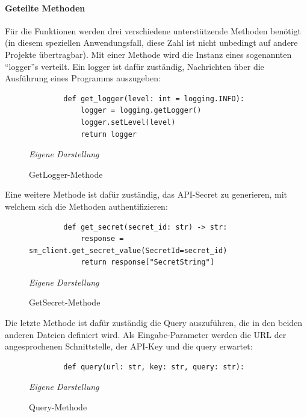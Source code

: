 	\paragraph{Geteilte Methoden}
		Für die Funktionen werden drei verschiedene unterstützende Methoden benötigt (in diesem speziellen Anwendungsfall, diese Zahl ist nicht unbedingt auf andere Projekte übertragbar). Mit einer Methode wird die Instanz eines 		sogenannten ``logger''s verteilt. Ein logger ist dafür zuständig, Nachrichten über die Ausführung eines Programms auszugeben:\newline
		\begin{figure}[H]
		\centering
		\begin{minipage}[t]{.7\textwidth} %
		\caption{GetLogger-Methode} %
		\begin{verbatim}
		def get_logger(level: int = logging.INFO):
		    logger = logging.getLogger()
		    logger.setLevel(level)
		    return logger
		\end{verbatim}
		
		\textit{Eigene Darstellung} %
		\label{fig:getLoggerMethode}
		\end{minipage}
		\end{figure}
	Eine weitere Methode ist dafür zuständig, das API-Secret zu generieren, mit welchem sich die Methoden authentifizieren:\newline
		\begin{figure}[H]
		\centering
		\begin{minipage}[t]{.7\textwidth} %
		\caption{GetSecret-Methode} %
		\begin{verbatim}
		def get_secret(secret_id: str) -> str:
		    response = sm_client.get_secret_value(SecretId=secret_id)
		    return response["SecretString"]
		\end{verbatim}
		
		\textit{Eigene Darstellung} %
		\label{fig:getSecretMethode}
		\end{minipage}
		\end{figure}
	Die letzte Methode ist dafür zuständig die Query auszuführen, die in den beiden anderen Dateien definiert wird. Als Eingabe-Parameter werden die URL der angesprochenen Schnittstelle, der API-Key und die query erwartet:\newline
		\begin{figure}[H]
		\centering
		\begin{minipage}[t]{.7\textwidth} %
		\caption{Query-Methode} %
		\begin{verbatim}
		def query(url: str, key: str, query: str):
		\end{verbatim}
		
		\textit{Eigene Darstellung} %
		\label{fig:queryMethode}
		\end{minipage}
		\end{figure}
